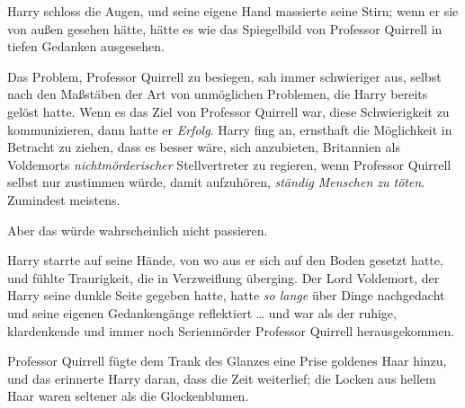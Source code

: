 Harry schloss die Augen, und seine eigene Hand massierte seine Stirn; wenn er sie von außen gesehen hätte, hätte es wie das Spiegelbild von Professor Quirrell in tiefen Gedanken ausgesehen.

Das Problem, Professor Quirrell zu besiegen, sah immer schwieriger aus, selbst nach den Maßstäben der Art von unmöglichen Problemen, die Harry bereits gelöst hatte. Wenn es das Ziel von Professor Quirrell war, diese Schwierigkeit zu kommunizieren, dann hatte er \emph{Erfolg}.
Harry fing an, ernsthaft die Möglichkeit in Betracht zu ziehen, dass es besser wäre, sich anzubieten, Britannien als Voldemorts \emph{nichtmörderischer} Stellvertreter zu regieren, wenn Professor Quirrell selbst nur zustimmen würde, damit aufzuhören, \emph{ständig Menschen zu töten}. Zumindest meistens.

Aber das würde wahrscheinlich nicht passieren.

Harry starrte auf seine Hände, von wo aus er sich auf den Boden gesetzt hatte, und fühlte Traurigkeit, die in Verzweiflung überging.
Der Lord Voldemort, der Harry seine dunkle Seite gegeben hatte, hatte \emph{so lange} über Dinge nachgedacht und seine eigenen Gedankengänge reflektiert … und war als der ruhige, klardenkende und immer noch Serienmörder Professor Quirrell herausgekommen.

Professor Quirrell fügte dem Trank des Glanzes eine Prise goldenes Haar hinzu, und das erinnerte Harry daran, dass die Zeit weiterlief; die Locken aus hellem Haar waren seltener als die Glockenblumen.

